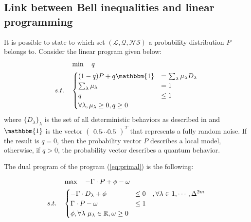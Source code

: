 \documentclass[12pt]{article}
\renewcommand{\L}{\mathcal{L}}
\newcommand{\NS}{\mathcal{NS}}
\newcommand{\Q}{\mathcal{Q}}
\begin{document}
\begin{multicols}{2}

\section*{Link between Bell inequalities and linear programming}
It is possible to state to which set $( \L, \Q, \NS )$ a probability distribution $P$ belongs to.
Consider the linear program given below:
\begin{equation} \label{eq:primal}
	\begin{aligned}
					& \min \quad q\\
		s.t. \quad  &
			\begin{cases}
		 			(1-q) P + q \mathbbm{1}  & = \sum_\lambda \mu_\lambda D_\lambda \\
					\sum_\lambda \mu_\lambda & = 1 \\
					q & \leq 1 \\
					\forall \lambda, \mu_\lambda \geq 0, q \geq 0
				\end{cases}
	\end{aligned}
\end{equation}
where $\{D_\lambda\}_\lambda$ is the set of all deterministic behaviors as
described in \cite{2014-bell-nonlocality} and $\mathbbm{1}$ is the vector
$\begin{pmatrix} 0.5 \cdots 0.5 \end{pmatrix}^T$ that represents a fully random
noise. If the result is $q = 0$, then the probability vector $P$ describes a
local model, otherwise, if $q > 0$, the probability vector describes a quantum
behavior.

The dual program of the program (\ref{eq:primal}) is the following:

\begin{equation} \label{eq:dual}
	\begin{aligned}
					& \max \quad -\Gamma \cdot P + \phi - \omega\\
		s.t. \quad  &
			\begin{cases}
		 			- \Gamma \cdot D_\lambda + \phi  & \leq 0 \quad, \forall \lambda \in {1, \cdots, \Delta^{2m} } \\
					\Gamma \cdot P - \omega & \leq 1 \\
					\phi, \forall \lambda $ $ \mu_\lambda \in \mathbb{R}, \omega \geq 0
				\end{cases}
	\end{aligned}
\end{equation}


\end{multicols}
\end{document}

